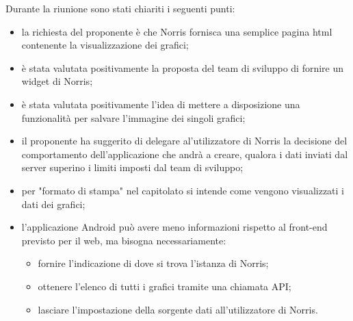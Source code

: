Durante la riunione sono stati chiariti i seguenti punti:
\begin{itemize}
\item la richiesta del proponente è che Norris fornisca una semplice pagina html contenente la visualizzazione dei grafici;
\item è stata valutata positivamente la proposta del team di sviluppo di fornire un widget di Norris;
\item è stata valutata positivamente l'idea di mettere a disposizione una funzionalità per salvare l'immagine dei singoli grafici;
\item il proponente ha suggerito di delegare al'utilizzatore di Norris la decisione del comportamento dell'applicazione che andrà a creare, qualora i dati inviati dal server superino i limiti imposti dal team di sviluppo;
\item per "formato di stampa" nel capitolato si intende come vengono visualizzati i dati dei grafici;
\item l'applicazione Android può avere meno informazioni rispetto al front-end previsto per il web, ma bisogna necessariamente:
\begin{itemize}
\item fornire l'indicazione di dove si trova l'istanza di Norris;
\item ottenere l'elenco di tutti i grafici tramite una chiamata API;
\item lasciare l'impostazione della sorgente dati all'utilizzatore di Norris.
\end{itemize}
\end{itemize}